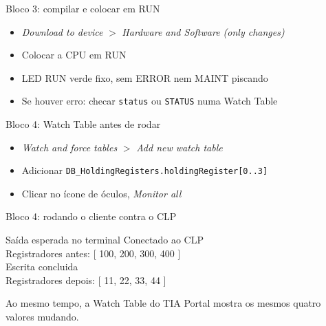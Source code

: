 \documentclass[12pt, aspectratio=169]{beamer}
\begin{document}
\begin{frame}{Bloco 3: compilar e colocar em RUN}
  \vspace{0.4cm}
  \begin{itemize}
    \item \emph{Download to device} $>$ \emph{Hardware and Software (only changes)}
    \item Colocar a CPU em RUN
    \item LED RUN verde fixo, sem ERROR nem MAINT piscando
    \item Se houver erro: checar \texttt{status} ou \texttt{STATUS} numa Watch Table
  \end{itemize}
\end{frame}

\begin{frame}{Bloco 4: Watch Table antes de rodar}
  \vspace{0.4cm}
  \begin{itemize}
    \item \emph{Watch and force tables} $>$ \emph{Add new watch table}
    \item Adicionar \texttt{DB\_HoldingRegisters.holdingRegister[0..3]}
    \item Clicar no ícone de óculos, \emph{Monitor all}
  \end{itemize}
\end{frame}

\begin{frame}{Bloco 4: rodando o cliente contra o CLP}
  \vspace{0.35cm}
  \begin{block}{Saída esperada no terminal}
    Conectado ao CLP\\
    Registradores antes: [ 100, 200, 300, 400 ]\\
    Escrita concluida\\
    Registradores depois: [ 11, 22, 33, 44 ]
  \end{block}

  \vspace{0.3cm}
  Ao mesmo tempo, a Watch Table do TIA Portal mostra os mesmos quatro valores mudando.
\end{frame}
\end{document}
